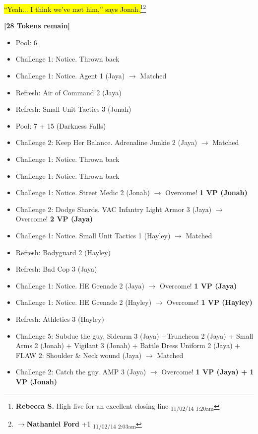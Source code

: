 \hl{``Yeah... I think we've met him,'' says Jonah.}\footnote{\textbf{Rebecca S. }High five for an excellent closing line \textsubscript{11/02/14 1:20am}}\footnote{$\rightarrow$\textbf{Nathaniel Ford }+1 \textsubscript{11/02/14 2:03am}}



\textbf{{[}28 Tokens remain{]}}





\begin{itemize}[noitemsep,topsep=0pt]
\item Pool: 6
\item Challenge 1: Notice.  Thrown back
\item Challenge 1: Notice.  Agent 1 (Jaya) $\rightarrow$ Matched
\item Refresh: Air of Command 2 (Jaya)
\item Refresh: Small Unit Tactics 3 (Jonah)
\item Pool: 7 + 15 (Darkness Falls)
\item Challenge 2: Keep Her Balance.  Adrenaline Junkie 2 (Jaya) $\rightarrow$ Matched
\item Challenge 1: Notice.  Thrown back
\item Challenge 1: Notice.  Thrown back
\item Challenge 1: Notice.  Street Medic 2 (Jonah) $\rightarrow$ Overcome! \textbf{1 VP (Jonah)}
\item Challenge 2: Dodge Shards.  VAC Infantry Light Armor 3 (Jaya) $\rightarrow$ Overcome! \textbf{2 VP (Jaya)}
\item Challenge 1: Notice.  Small Unit Tactics 1 (Hayley) $\rightarrow$ Matched
\item Refresh: Bodyguard 2 (Hayley)
\item Refresh: Bad Cop 3 (Jaya)
\item Challenge 1: Notice.  HE Grenade 2 (Jaya) $\rightarrow$ Overcome! \textbf{1 VP (Jaya)}
\item Challenge 1: Notice.  HE Grenade 2 (Hayley) $\rightarrow$ Overcome! \textbf{1 VP (Hayley)}
\item Refresh: Athletics 3 (Hayley)
\item Challenge 5: Subdue the guy.  Sidearm 3 (Jaya) +Truncheon 2 (Jaya) + Small Arms 2 (Jonah) + Vigilant 3 (Jonah) + Battle Dress Uniform 2 (Jaya) + FLAW 2: Shoulder \& Neck wound (Jaya) $\rightarrow$ Matched
\item Challenge 2: Catch the guy.  AMP 3 (Jaya) $\rightarrow$ Overcome! \textbf{1 VP (Jaya) + } \textbf{1 VP (Jonah)}

\end{itemize}
